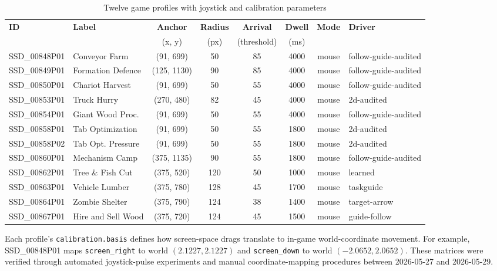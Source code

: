 \documentclass[11pt,a4paper]{article}
\begin{document}
\begin{table}[H]
\centering
\caption{Twelve game profiles with joystick and calibration parameters}
\label{tab:profiles}
\scriptsize
\begin{tabular}{@{}llcccccl@{}}
\toprule
\textbf{ID} & \textbf{Label} & \textbf{Anchor} & \textbf{Radius} & \textbf{Arrival} & \textbf{Dwell} & \textbf{Mode} & \textbf{Driver} \\
 & & (x, y) & (px) & (threshold) & (ms) & & \\
\midrule
SSD\_00848P01 & Conveyor Farm     & (91, 699)  & 50  & 85 & 4000 & mouse & follow-guide-audited \\
SSD\_00849P01 & Formation Defence & (125, 1130)& 90  & 85 & 4000 & mouse & follow-guide-audited \\
SSD\_00850P01 & Chariot Harvest   & (91, 699)  & 50  & 55 & 4000 & mouse & follow-guide-audited \\
SSD\_00853P01 & Truck Hurry       & (270, 480) & 82  & 45 & 4000 & mouse & 2d-audited \\
SSD\_00854P01 & Giant Wood Proc.  & (91, 699)  & 50  & 55 & 4000 & mouse & follow-guide-audited \\
SSD\_00858P01 & Tab Optimization  & (91, 699)  & 50  & 55 & 1800 & mouse & 2d-audited \\
SSD\_00858P02 & Tab Opt. Pressure & (91, 699)  & 50  & 55 & 1800 & mouse & 2d-audited \\
SSD\_00860P01 & Mechanism Camp    & (375, 1135)& 90  & 55 & 1800 & mouse & follow-guide-audited \\
SSD\_00862P01 & Tree \& Fish Cut  & (375, 520) & 120 & 50 & 1000 & mouse & learned \\
SSD\_00863P01 & Vehicle Lumber    & (375, 780) & 128 & 45 & 1700 & mouse & taskguide \\
SSD\_00864P01 & Zombie Shelter    & (375, 790) & 124 & 38 & 1400 & mouse & target-arrow \\
SSD\_00867P01 & Hire and Sell Wood & (375, 720) & 124 & 45 & 1500 & mouse & guide-follow \\
\bottomrule
\end{tabular}
\end{table}

Each profile's \texttt{calibration.basis} defines how screen-space drags translate to in-game world-coordinate movement. For example, SSD\_00848P01 maps \texttt{screen\_right} to world $(2.1227, 2.1227)$ and \texttt{screen\_down} to world $(-2.0652, 2.0652)$. These matrices were verified through automated joystick-pulse experiments and manual coordinate-mapping procedures between 2026-05-27 and 2026-05-29.
\end{document}

